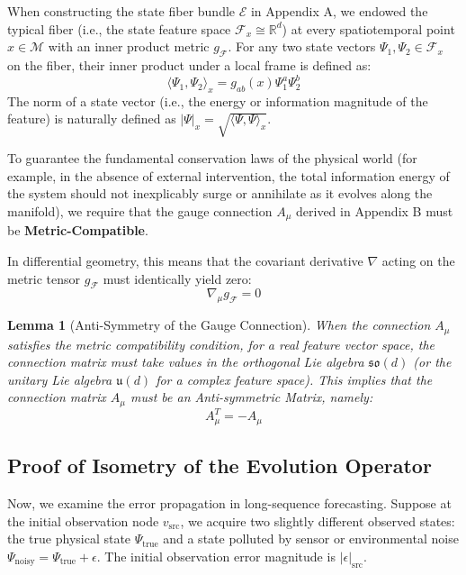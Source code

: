 \documentclass{article}
\newtheorem{lemma}{Lemma}
\begin{document}
When constructing the state fiber bundle $\mathcal{E}$ in Appendix A, we endowed the typical fiber (i.e., the state feature space $\mathcal{F}_x \cong \mathbb{R}^d$) at every spatiotemporal point $x \in \mathcal{M}$ with an inner product metric $g_{\mathcal{F}}$. For any two state vectors $\Psi_1, \Psi_2 \in \mathcal{F}_x$ on the fiber, their inner product under a local frame is defined as:
\begin{equation}
\langle \Psi_1, \Psi_2 \rangle_x = g_{ab}(x) \Psi_1^a \Psi_2^b
\end{equation}
The norm of a state vector (i.e., the energy or information magnitude of the feature) is naturally defined as $|\Psi|_x = \sqrt{\langle \Psi, \Psi \rangle_x}$.

To guarantee the fundamental conservation laws of the physical world (for example, in the absence of external intervention, the total information energy of the system should not inexplicably surge or annihilate as it evolves along the manifold), we require that the gauge connection $A_\mu$ derived in Appendix B must be \textbf{Metric-Compatible}.

In differential geometry, this means that the covariant derivative $\nabla$ acting on the metric tensor $g_{\mathcal{F}}$ must identically yield zero:
\begin{equation}
\nabla_\mu g_{\mathcal{F}} = 0
\end{equation}

\begin{lemma}[Anti-Symmetry of the Gauge Connection]
When the connection $A_\mu$ satisfies the metric compatibility condition, for a real feature vector space, the connection matrix must take values in the orthogonal Lie algebra $\mathfrak{so}(d)$ (or the unitary Lie algebra $\mathfrak{u}(d)$ for a complex feature space). This implies that the connection matrix $A_\mu$ must be an Anti-symmetric Matrix, namely:
\begin{equation}
A_\mu^T = -A_\mu
\end{equation}
\end{lemma}

\subsection{Proof of Isometry of the Evolution Operator}

Now, we examine the error propagation in long-sequence forecasting. Suppose at the initial observation node $v_{\text{src}}$, we acquire two slightly different observed states: the true physical state $\Psi_{\text{true}}$ and a state polluted by sensor or environmental noise $\Psi_{\text{noisy}} = \Psi_{\text{true}} + \epsilon$. The initial observation error magnitude is $|\epsilon|_{\text{src}}$.
\end{document}
